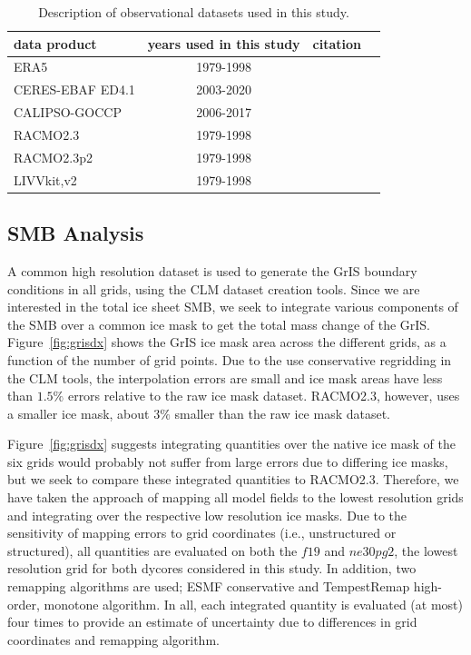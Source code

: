 \documentclass[draft]{agujournal2019}
\begin{document}
 \begin{table}
 \centering
 \scriptsize
 \begin{tabular}{lccc}
   \hline
   data product & years used in this study & citation \\ 
   \hline
   ERA5 & 1979-1998 & \cite{ERA5} \\
   CERES-EBAF ED4.1 & 2003-2020 & \cite{CERES-EBAF} \\
   CALIPSO-GOCCP & 2006-2017 & \cite{CALIPSO-GOCCP} \\
   RACMO2.3 & 1979-1998 & \cite{NETAL2015TC} \\
   RACMO2.3p2 & 1979-1998 & \cite{NETAL2019SCIENCE} \\
   LIVVkit,v2 & 1979-1998 & \cite{LIVVkit} \\
 \hline
 \end{tabular}
  \caption{Description of observational datasets used in this study.}
 \label{tbl:table2}
 \end{table}

\subsection{SMB Analysis}

A common high resolution dataset is used to generate the GrIS boundary conditions in all grids, using the CLM dataset creation tools. Since we are interested in the total ice sheet SMB, we seek to integrate various components of the SMB over a common ice mask to get the total mass change of the GrIS. Figure~\ref{fig:grisdx} shows the GrIS ice mask area across the different grids, as a function of the number of grid points. Due to the use conservative regridding in the CLM tools, the interpolation errors are small and ice mask areas have less than $1.5\%$ errors relative to the raw ice mask dataset. RACMO2.3, however, uses a smaller ice mask, about $3\%$ smaller than the raw ice mask dataset.

Figure~\ref{fig:grisdx} suggests integrating quantities over the native ice mask of the six grids would probably not suffer from large errors due to differing ice masks, but we seek to compare these integrated quantities to RACMO2.3. Therefore, we have taken the approach of mapping all model fields to the lowest resolution grids and integrating over the respective low resolution ice masks. Due to the sensitivity of mapping errors to grid coordinates (i.e., unstructured or structured), all quantities are evaluated on both the $f19$ and $ne30pg2$, the lowest resolution grid for both dycores considered in this study. In addition, two remapping algorithms are used; ESMF conservative and TempestRemap high-order, monotone algorithm. In all, each integrated quantity is evaluated (at most) four times to provide an estimate of uncertainty due to differences in grid coordinates and remapping algorithm.
\end{document}
